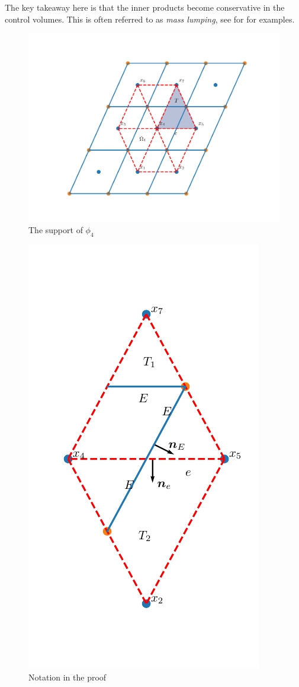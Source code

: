 \documentclass[../Main/main.tex]{subfiles}
\begin{document}
	The key takeaway here is that the inner products become conservative in the control volumes. This is often referred to as \emph{mass lumping}, see for \cite{baranger1996connection} for examples.  
	\par
		\begin{figure}[H]
		\centering
		\includegraphics[width=1\textwidth]{Control volume.pdf}
		\caption{The support of $\phi_4$}
		\label{fig:control volume}
	\end{figure}
	\begin{figure}[H]
		\centering
		\includegraphics{two triangles.pdf}
		\caption{Notation in the proof}
		\label{fig:two triangles}
	\end{figure}
\end{document}
